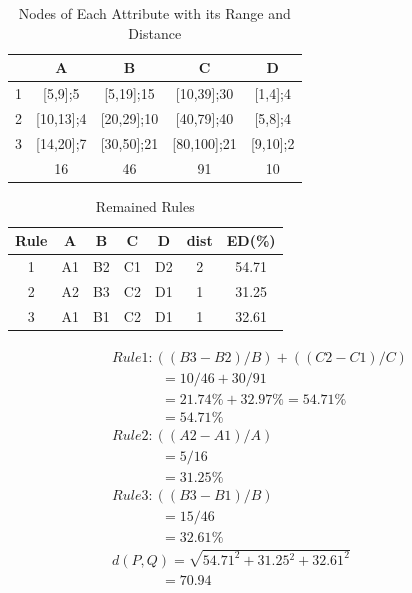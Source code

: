 \documentclass[fleqn,10pt,twocolumn]{SICE14}
\begin{document}

\begin{table}[tb]
\caption{\label{attributes-list}Nodes of Each Attribute with its Range and Distance}
\begin{tabular}{|c|c|c|c|c|}
\hline 
 & A & B & C & D\tabularnewline
\hline 
1 & {[}5,9{]};5 & {[}5,19{]};15 & {[}10,39{]};30 & {[}1,4{]};4\tabularnewline
\hline 
2 & {[}10,13{]};4 & {[}20,29{]};10 & {[}40,79{]};40 & {[}5,8{]};4\tabularnewline
\hline 
3 & {[}14,20{]};7 & {[}30,50{]};21 & {[}80,100{]};21 & {[}9,10{]};2\tabularnewline
\hline 
 & 16 & 46 & 91 & 10\tabularnewline
\hline 
\end{tabular}
\end{table}

\begin{table}[tb]
\caption{\label{remained-rules}Remained Rules}
\begin{center}
\begin{tabular}{|c|c|c|c|c|c|c|}
\hline 
Rule & A & B & C & D & dist & ED(\%)\tabularnewline
\hline 
1 & A1 & B2 & C1 & D2 & 2 & 54.71\tabularnewline
\hline 
2 & A2 & B3 & C2 & D1 & 1 & 31.25\tabularnewline
\hline 
3 & A1 & B1 & C2 & D1 & 1 & 32.61\tabularnewline
\hline 
\end{tabular}
\end{center}
\end{table}

\begin{eqnarray}
\begin{array}{lllllllll}
Rule1:((B3-B2)/B)+((C2-C1)/C) \\ 
\qquad\quad\,\,\,=10/46+30/91 \\ 
\qquad\quad\,\,\,=21.74\%+32.97\%=54.71\% \\
\qquad\quad\,\,\,=54.71\% \\
Rule2:((A2-A1)/A) \\
\qquad\quad\,\,\,=5/16 \\
\qquad\quad\,\,\,=31.25\% \\
Rule3:((B3-B1)/B) \\
\qquad\quad\,\,\,=15/46 \\
\qquad\quad\,\,\,=32.61\% \\
d(P,Q)=\sqrt{54.71^{2}+31.25{}^{2}+32.61^{2}} \\
\qquad\quad\,\,\,=70.94
\end{array}
\label{euclidean-distance-calculation}
\end{eqnarray}
\end{document}
